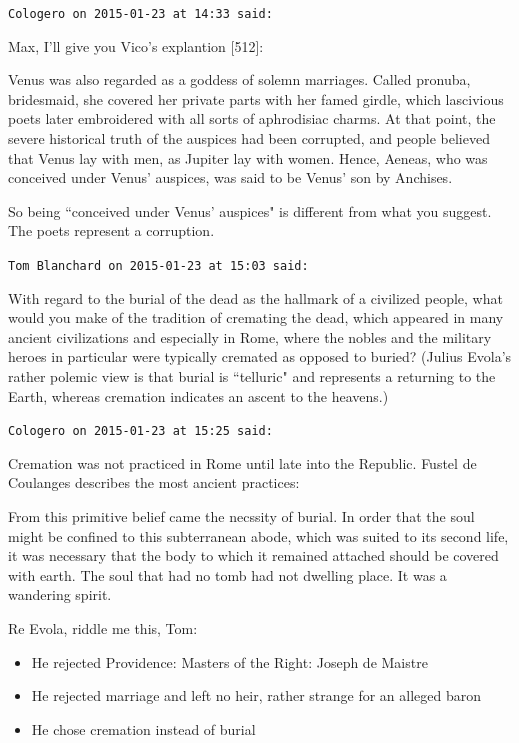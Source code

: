 \begin{footnotesize}
\begin{sffamily}
\hfill

\texttt{Cologero on 2015-01-23 at 14:33 said: }

Max, I'll give you Vico's explantion [512]:

\begin{quotex}
Venus was also regarded as a goddess of solemn marriages. Called pronuba, bridesmaid, she covered her private parts with her famed girdle, which lascivious poets later embroidered with all sorts of aphrodisiac charms. At that point, the severe historical truth of the auspices had been corrupted, and people believed that Venus lay with men, as Jupiter lay with women. Hence, Aeneas, who was conceived under Venus' auspices, was said to be Venus' son by Anchises. 

\end{quotex}
So being ``conceived under Venus' auspices" is different from what you suggest. The poets represent a corruption.


\hfill

\texttt{Tom Blanchard on 2015-01-23 at 15:03 said: }

With regard to the burial of the dead as the hallmark of a civilized people, what would you make of the tradition of cremating the dead, which appeared in many ancient civilizations and especially in Rome, where the nobles and the military heroes in particular were typically cremated as opposed to buried? (Julius Evola's rather polemic view is that burial is ``telluric" and represents a returning to the Earth, whereas cremation indicates an ascent to the heavens.)


\hfill

\texttt{Cologero on 2015-01-23 at 15:25 said: }

Cremation was not practiced in Rome until late into the Republic. Fustel de Coulanges describes the most ancient practices:

\begin{quotex}
From this primitive belief came the necssity of burial. In order that the soul might be confined to this subterranean abode, which was suited to its second life, it was necessary that the body to which it remained attached should be covered with earth. The soul that had no tomb had not dwelling place. It was a wandering spirit. 

\end{quotex}
Re Evola, riddle me this, Tom:

\begin{itemize}
\item He rejected Providence: Masters of the Right: Joseph de Maistre 
\item He rejected marriage and left no heir, rather strange for an alleged baron 
\item He chose cremation instead of burial 
\end{itemize}


\end{sffamily}
\end{footnotesize}
